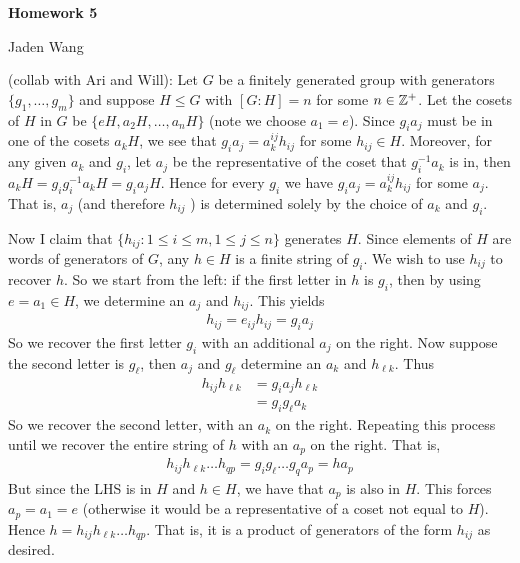 \documentclass[12pt]{article}
\begin{document}
\centerline {\textsf{\textbf{\LARGE{Homework 5}}}}
\centerline {Jaden Wang}
\vspace{.15in}

\begin{problem}[1]
	(collab with Ari and Will): Let $ G$ be a finitely generated group with generators $ \{g_1,\ldots,g_m\} $ and suppose $ H \leq G$ with $ [G:H] = n$ for some $ n \in \mathbb{Z}^{+}$. Let the cosets of $ H$ in  $ G$ be $ \{eH,a_2H,\ldots,a_n H\} $ (note we choose $ a_1 = e$). Since $ g_i a_j$ must be in one of the cosets $ a_k H$, we see that $ g_i a_j = a_k^{ij} h_{ij}$ for some $ h_{ij} \in H$. Moreover, for any given $ a_k$ and $ g_i$, let $ a_j$ be the representative of the coset that $ g_i ^{-1} a_k$ is in, then $ a_k H = g_i g_i ^{-1} a_k H = g_i a_j H$. Hence for every $ g_i$ we have $ g_i a_j = a_k^{ij} h_{ij}$ for some $ a_j$. That is, $ a_j$ (and therefore $ h_{ij}$ ) is determined solely by the choice of $ a_k$ and $ g_i$.

	Now I claim that $ \{h_{ij}:1\leq i \leq m, 1 \leq j\leq n\} $ generates $ H$. Since elements of $ H$ are words of generators of  $ G$, any $ h \in H$ is a finite string of $ g_i$. We wish to use $ h_{ij}$ to recover $ h$. So we start from the left: if the first letter in $ h$ is $ g_i$, then by using $ e =a_1 \in H$, we determine an $ a_j$ and $ h_{ij}$. This yields
	\begin{align*}
		h_{ij} = e_{ij} h_{ij} = g_i a_j 
	\end{align*}
So we recover the first letter $ g_i$ with an additional $ a_j$ on the right. Now suppose the second letter is $ g_\ell$, then $ a_j$ and $ g_{\ell}$ determine an $ a_k$ and $ h_{\ell k}$. Thus
\begin{align*}
	 h_{ij} h_{\ell k} &= g_i a_j h_{\ell k} \\
	&= g_i g_\ell a_k 
\end{align*}
So we recover the second letter, with an $ a_k$ on the right. Repeating this process until we recover the entire string of $ h$ with an $ a_p$ on the right. That is,
\begin{align*}
	h_{ij} h_{\ell k} \ldots h_{qp} = g_i g_\ell \ldots g_q a_p  = h a_p
\end{align*}
But since the LHS is in $ H$ and $ h \in H$, we have that $ a_p$ is also in  $ H$. This forces $ a_p = a_1 = e$ (otherwise it would be a representative of a coset not equal to $ H$). Hence $ h = h_{ij} h_{\ell k} \ldots h_{qp}$. That is, it is a product of generators of the form $ h_{ij}$ as desired.
\end{problem}
\end{document}
